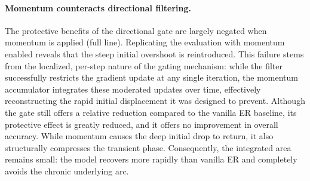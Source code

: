 \paragraph{Momentum counteracts directional filtering.}
The protective benefits of the directional gate are largely negated when momentum is applied (full line). Replicating the evaluation with momentum enabled reveals that the steep initial overshoot is reintroduced. This failure stems from the localized, per-step nature of the gating mechanism: while the filter successfully restricts the gradient update at any single iteration, the momentum accumulator integrates these moderated updates over time, effectively reconstructing the rapid initial displacement it was designed to prevent. Although the gate still offers a relative reduction compared to the vanilla ER baseline, its protective effect is greatly reduced, and it offers no improvement in overall accuracy. While momentum causes the deep initial drop to return, it also structurally compresses the transient phase. Consequently, the integrated area remains small: the model recovers more rapidly than vanilla ER and completely avoids the chronic underlying arc.




